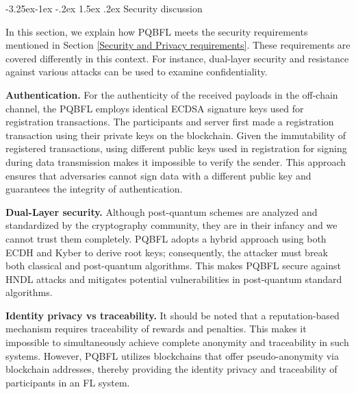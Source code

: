\documentclass[a4paper,fleqn]{cas-dc}
\makeatletter
\renewcommand\subsection{\@startsection{subsection}{2}{\z@}%
   {-3.25ex\@plus -1ex \@minus -.2ex}%
   {1.5ex \@plus .2ex}%
   {\normalfont\large}} %
\makeatother
\begin{document}
\subsection{Security discussion}

In this section, we explain how PQBFL meets the security requirements mentioned in Section \ref{Security and Privacy requirements}. 
These requirements are covered differently in this context. For instance, dual-layer security and resistance against various attacks can be used to examine confidentiality.

\noindent\textbf{Authentication.}
For the authenticity of the received payloads in the off-chain channel, the PQBFL employs identical ECDSA signature keys used for registration transactions. 
The participants and server first made a registration transaction using their private keys on the blockchain. 
Given the immutability of registered transactions, using different public keys used in registration for signing during data transmission makes it impossible to verify the sender. 
This approach ensures that adversaries cannot sign data with a different public key and guarantees the integrity of authentication.

\noindent\textbf{Dual-Layer security.}
Although post-quantum schemes are analyzed and standardized by the cryptography community, they are in their infancy and we cannot trust them completely. 
PQBFL adopts a hybrid approach using both ECDH and Kyber to derive root keys; consequently, the attacker must break both classical and post-quantum algorithms. 
This makes PQBFL secure against HNDL attacks and mitigates potential vulnerabilities in post-quantum standard algorithms.

\noindent\textbf{Identity privacy vs traceability.}
It should be noted that a reputation-based mechanism requires traceability of rewards and penalties. This makes it impossible to simultaneously achieve complete anonymity and traceability in such systems. 
However, PQBFL utilizes blockchains that offer pseudo-anonymity via blockchain addresses, thereby providing the identity privacy and traceability of participants in an FL system. 
\end{document}
